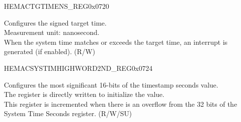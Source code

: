 \begin{register}{H}{EMACTGTIMENS\_REG}{0x0720}\label{regdesc:EMACTARGETTIMENANOSREG}
%
%
\regnewline%
\begin{regdesc}\begin{reglist}
\item [TTSLO] Configures the signed target time.\\
Measurement unit: nanosecond.\\
When the system time matches or exceeds the target time, an interrupt is generated (if enabled). (R/W)
\end{reglist}\end{regdesc}
\end{register}

\begin{register}{H}{EMACSYSTIMHIGHWORD2ND\_REG}{0x0724}\label{regdesc:EMACSYSTEMTIMEHIGHERWORDSECONDREG}
%
%
\regnewline%
\begin{regdesc}\begin{reglist}
\item [TSHWR] Configures the most significant 16-bits of the timestamp seconds value.\\
The register is directly written to initialize the value.\\
This register is incremented when there is an overflow from the 32 bits of the System Time Seconds register. (R/W/SU)
\end{reglist}\end{regdesc}
\end{register}

